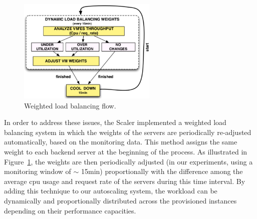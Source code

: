 \begin{figure}[htb]
  \begin{center}
    \includegraphics[height=5cm]{images/load_balancing}
  \end{center}
\vspace{-5mm}
  \caption{Weighted load balancing flow.}
  \label{fig:load_balancing}
\end{figure}


In order to address these issues, the Scaler implemented a weighted 
load balancing system in which the weights of the servers are 
periodically re-adjusted automatically, based on the monitoring data.  
This method assigns the same weight to each backend server at the 
beginning of the process. As illustrated in Figure~\ref{fig:load_balancing}, the weights are then periodically
adjusted (in our experiments, using a monitoring window of $\sim$ 15min) proportionally 
with the difference among the average cpu usage and request rate of the servers 
during this time interval. By adding this technique to our autoscaling system, 
the workload can be dynamically and proportionally distributed across the provisioned instances
depending on their performance capacities.




